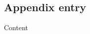 \subsection{Appendix entry}
\label{Appendix Ref}
    \begin{appendix_Entry}
      Content
    \end{appendix_Entry}
    \pagebreak
    